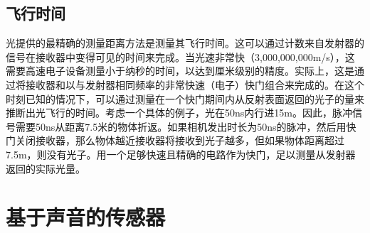 \subsection{飞行时间}

光提供的最精确的测量距离方法是测量其飞行时间。这可以通过计数来自发射器的信号在接收器中变得可见的时间来完成。当光速非常快（3,000,000,000m/s），这需要高速电子设备测量小于纳秒的时间，以达到厘米级别的精度。实际上，这是通过将接收器和以与发射器相同频率的非常快速（电子）快门组合来完成的。在这个时刻已知的情况下，可以通过测量在一个快门期间内从反射表面返回的光子的量来推断出光飞行的时间。考虑一个具体的例子，光在50ns内行进15m。因此，脉冲信号需要50ns从距离7.5米的物体折返。如果相机发出时长为50ns的脉冲，然后用快门关闭接收器，那么物体越近接收器将接收到光子越多，但如果物体距离超过7.5m，则没有光​​子。用一个足够快速且精确的电路作为快门，足以测量从发射器返回的实际光量。


\section{基于声音的传感器}

